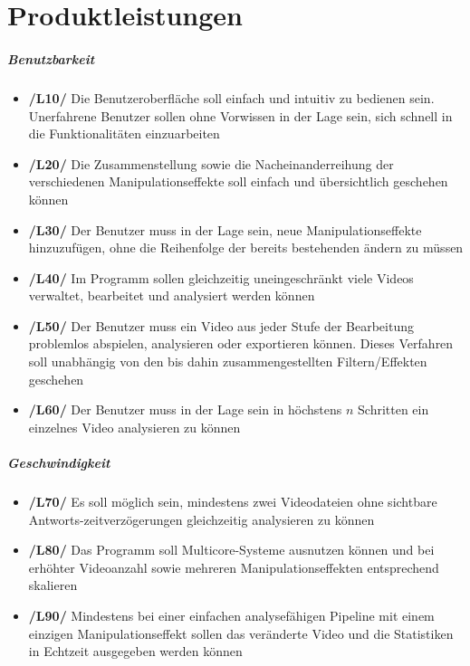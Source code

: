 \section{Produktleistungen}

\subparagraph{Benutzbarkeit}
\begin{itemize}
\item{\textbf{/L10/} Die Benutzeroberfläche soll einfach und intuitiv zu bedienen sein. Unerfahrene Benutzer sollen ohne Vorwissen in der Lage sein, sich schnell in die Funktionalitäten einzuarbeiten}
\item{\textbf{/L20/} Die Zusammenstellung sowie die Nacheinanderreihung der verschiedenen Manipulationseffekte soll einfach und übersichtlich geschehen können}
\item{\textbf{/L30/} Der Benutzer muss in der Lage sein, neue Manipulationseffekte hinzuzufügen, ohne die Reihenfolge der bereits bestehenden ändern zu müssen}
\item{\textbf{/L40/} Im Programm sollen gleichzeitig uneingeschränkt viele Videos verwaltet, bearbeitet und analysiert werden können}
\item{\textbf{/L50/} Der Benutzer muss ein Video aus jeder Stufe der Bearbeitung problemlos abspielen, analysieren oder exportieren können. Dieses Verfahren soll unabhängig von den bis dahin zusammengestellten Filtern/Effekten geschehen}
\item{\textbf{/L60/} Der Benutzer muss in der Lage sein in höchstens $n$ Schritten ein einzelnes Video analysieren zu können}
\end{itemize}

\subparagraph{Geschwindigkeit}

\begin{itemize}
\item{\textbf{/L70/} Es soll möglich sein, mindestens zwei Videodateien ohne sichtbare Antworts-zeitverzögerungen gleichzeitig analysieren zu können}
\item{\textbf{/L80/} Das Programm soll Multicore-Systeme ausnutzen können und bei erhöhter Videoanzahl sowie mehreren Manipulationseffekten entsprechend skalieren}
\item{\textbf{/L90/} Mindestens bei einer einfachen analysefähigen Pipeline mit einem einzigen Manipulationseffekt sollen das veränderte Video und die Statistiken in Echtzeit ausgegeben werden können}
\end{itemize}

